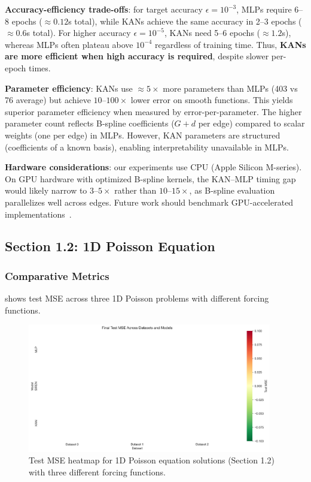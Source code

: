 \documentclass[11pt,a4paper]{article}
\begin{document}
\textbf{Accuracy-efficiency trade-offs}: for target accuracy $\epsilon = 10^{-3}$, MLPs require 6--8 epochs ($\approx 0.12$s total), while KANs achieve the same accuracy in 2--3 epochs ($\approx 0.6$s total). For higher accuracy $\epsilon = 10^{-5}$, KANs need 5--6 epochs ($\approx 1.2$s), whereas MLPs often plateau above $10^{-4}$ regardless of training time. Thus, \textbf{KANs are more efficient when high accuracy is required}, despite slower per-epoch times.

\textbf{Parameter efficiency}: KANs use $\approx 5\times$ more parameters than MLPs (403 vs 76 average) but achieve $10$--$100\times$ lower error on smooth functions. This yields superior parameter efficiency when measured by error-per-parameter. The higher parameter count reflects B-spline coefficients ($G+d$ per edge) compared to scalar weights (one per edge) in MLPs. However, KAN parameters are structured (coefficients of a known basis), enabling interpretability unavailable in MLPs.

\textbf{Hardware considerations}: our experiments use CPU (Apple Silicon M-series). On GPU hardware with optimized B-spline kernels, the KAN--MLP timing gap would likely narrow to $3$--$5\times$ rather than $10$--$15\times$, as B-spline evaluation parallelizes well across edges. Future work should benchmark GPU-accelerated implementations~\citep{liu2024kan}.

\subsection{Section 1.2: 1D Poisson Equation}

\subsubsection{Comparative Metrics}

 shows test MSE across three 1D Poisson problems with different forcing functions.

\begin{figure}[htbp]
\centering
\includegraphics[width=0.95\textwidth]{../section1/analysis/section1_complete_analysis_20251021_143055/section1_2_analysis/01_comparative_metrics/all_datasets_heatmap_test.png}
\caption{Test MSE heatmap for 1D Poisson equation solutions (Section 1.2) with three different forcing functions.}
\label{fig:s12_heatmap}
\end{figure}
\end{document}

